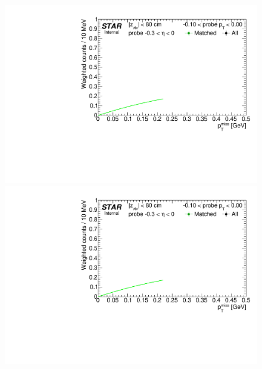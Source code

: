 \begin{figure}[ht]
{}~~~~
\parbox{0.24\textwidth}{ 
  \centering
  \includegraphics[width=\linewidth,page=8]{graphics/correctionsToEff/TOF_tagAndProbe/Fitting_effVsPt_data_ETABINS_C.CPT2.pdf}\\
  \includegraphics[width=\linewidth,page=10]{graphics/correctionsToEff/TOF_tagAndProbe/Fitting_effVsPt_data_ETABINS_C.CPT2.pdf}\\[84pt]

}
\end{figure}
